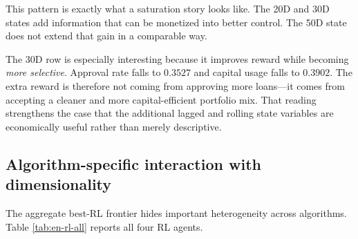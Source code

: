 \documentclass[12pt,a4paper]{article}
\begin{document}
This pattern is exactly what a saturation story looks like. The 20D and 30D states add information that can be monetized into better control. The 50D state does not extend that gain in a comparable way.

The 30D row is especially interesting because it improves reward while becoming \emph{more selective}. Approval rate falls to $0.3527$ and capital usage falls to $0.3902$. The extra reward is therefore not coming from approving more loans---it comes from accepting a cleaner and more capital-efficient portfolio mix. That reading strengthens the case that the additional lagged and rolling state variables are economically useful rather than merely descriptive.

\subsection{Algorithm-specific interaction with dimensionality}

The aggregate best-RL frontier hides important heterogeneity across algorithms. Table \ref{tab:en-rl-all} reports all four RL agents.
\end{document}

